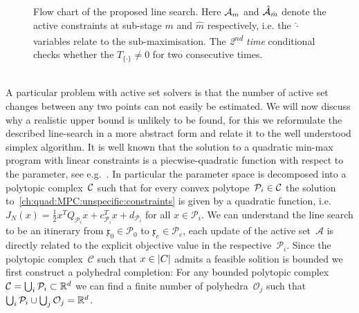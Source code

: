 \begin{figure}
\caption[Flow chart illustrating line search]{Flow chart of the proposed line search. Here $\mathcal A_{m}$ and $\hat{\mathcal A}_{\hat m}$ denote the active constraints at sub-stage $m$ and $\hat m$ respectively, i.e. the $\hat\cdot$ variables relate to the sub-maximisation.
%
The \emph{2\textsuperscript{nd} time} conditional checks whether the $T_{\{\cdot\}}\neq0$ for two consecutive times.}
\label{fig:flow:chart:line:search:standard}
\end{figure}
%
\\[1em]
%
\mysplit A particular problem with active set solvers is that the number of active set changes between any two points can not easily be estimated.
%
We will now discuss why a realistic upper bound is unlikely to be found, for this we reformulate the described line-search in a more abstract form and relate it to the well understood simplex algorithm.
%
It is well known that the solution to a quadratic min-max program with linear constraints is a piecwise-quadratic function with respect to the parameter, see e.g.~\cite{Sun:1992,Tondel:2003,Baotic:2002}.
%
In particular the parameter space is decomposed into a polytopic complex~$\mathcal C$ such that for every convex polytope~$\mathcal P_i\in\mathcal C$ the solution to~\eqref{ch:quad:MPC:unspecific:constraints} is given by a quadratic function, i.e. $J_N(x) = \frac{1}{2}x^TQ_{\mathcal P_i}x +c_{\mathcal P_i}^Tx + d_{\mathcal P_i}$ for all $x\in\mathcal P_i$.
%
We can understand the line search to be an itinerary from $\mathfrak{x}_0\in\mathcal P_0$ to $\mathfrak{x}_e\in\mathcal P_e$, each update of the active set~$\mathcal A$ is directly related to the explicit objective value in the respective~$\mathcal P_i$.
%
Since the polytopic complex~$\mathcal C$ such that $x\in\left|C\right|$ admits a feasible solition is bounded we first construct a polyhedral completion: For any bounded polytopic complex $\mathcal C=\bigcup_i\mathcal P_i\subset\mathbb R^d$ we can find a finite number of polyhedra~$\mathcal O_j$ such that $\bigcup_i\mathcal P_i\cup\bigcup_j\mathcal O_j=\mathbb R^d$.
